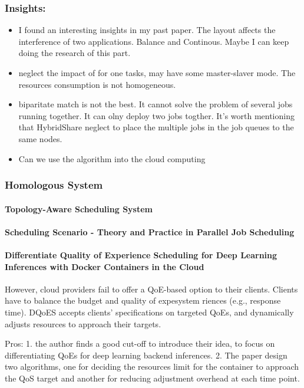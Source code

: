 \documentclass[8pt,UTF8]{article}
\begin{document}
        \subsubsection{Insights:}
            \begin{itemize}
                \item I found an interesting insights in my past paper. The layout affects the interference of two applications. Balance and Continous. Maybe I can keep doing the research of this part.
                \item neglect the impact of for one tasks, may have some master-slaver mode. The resources consumption is not homogeneous.
                \item biparitate match is not the best. It cannot solve the problem of several jobs running together. It can olny deploy two jobs togther. It's worth mentioning that HybridShare neglect to place the multiple jobs in the job queues to the same nodes.
                \item Can we use the algorithm into the cloud computing
            \end{itemize}
        \subsubsection{Homologous System}
            \paragraph{Topology-Aware Scheduling System}
            \paragraph{Scheduling Scenario - Theory and Practice in Parallel Job Scheduling}
            \paragraph{Differentiate Quality of Experience Scheduling for Deep Learning Inferences with Docker Containers in the Cloud}
                However, cloud providers fail to offer a QoE-based option to their clients. Clients have to balance the budget and quality of expesystem
                riences (e.g., response time). DQoES accepts clients’ specifications on targeted QoEs, and dynamically adjusts resources to approach their targets. 
                
                Pros: 1. the author finds a good cut-off to introduce their idea, to focus on differentiating QoEs for deep learning backend inferences. 2. The paper design two algorithms, one for deciding the resources limit for the container to approach the QoS target and another for reducing adjustment overhead at each time point.
                
\end{document}
